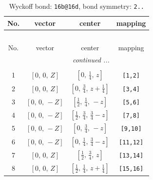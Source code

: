 \documentclass[fleqn,8pt]{jsarticle}
\begin{document}
\begin{longtable}{cccc}
\caption{Wyckoff bond: {\tt 16b@16d}, bond symmetry: {\tt 2..}}
 \\
 \hline \hline
No. & vector & center & mapping \\ \hline \endfirsthead

\multicolumn{3}{l}{\tablename\ \thetable{}} \\
 \hline \hline
No. & vector & center & mapping \\ \hline \endhead

 \hline \hline
\multicolumn{3}{r}{\footnotesize\it continued ...} \\ \endfoot

 \hline \hline
\multicolumn{3}{r}{} \\ \endlastfoot

1 & $\left[ 0,\, 0,\, Z \right]$ & $\left[ 0,\, \frac{1}{4},\, z \right]$ & {\tt [1,2]} \\ \hline
2 & $\left[ 0,\, 0,\, Z \right]$ & $\left[ 0,\, \frac{3}{4},\, z + \frac{1}{4} \right]$ & {\tt [3,4]} \\ \hline
3 & $\left[ 0,\, 0,\, - Z \right]$ & $\left[ \frac{1}{2},\, \frac{1}{4},\, - z \right]$ & {\tt [5,6]} \\ \hline
4 & $\left[ 0,\, 0,\, - Z \right]$ & $\left[ \frac{1}{2},\, \frac{3}{4},\, \frac{3}{4} - z \right]$ & {\tt [7,8]} \\ \hline
5 & $\left[ 0,\, 0,\, - Z \right]$ & $\left[ 0,\, \frac{3}{4},\, - z \right]$ & {\tt [9,10]} \\ \hline
6 & $\left[ 0,\, 0,\, - Z \right]$ & $\left[ 0,\, \frac{1}{4},\, \frac{3}{4} - z \right]$ & {\tt [11,12]} \\ \hline
7 & $\left[ 0,\, 0,\, Z \right]$ & $\left[ \frac{1}{2},\, \frac{3}{4},\, z \right]$ & {\tt [13,14]} \\ \hline
8 & $\left[ 0,\, 0,\, Z \right]$ & $\left[ \frac{1}{2},\, \frac{1}{4},\, z + \frac{1}{4} \right]$ & {\tt [15,16]} \\
\end{longtable}
\renewcommand{\arraystretch}{1.2}
\end{document}
